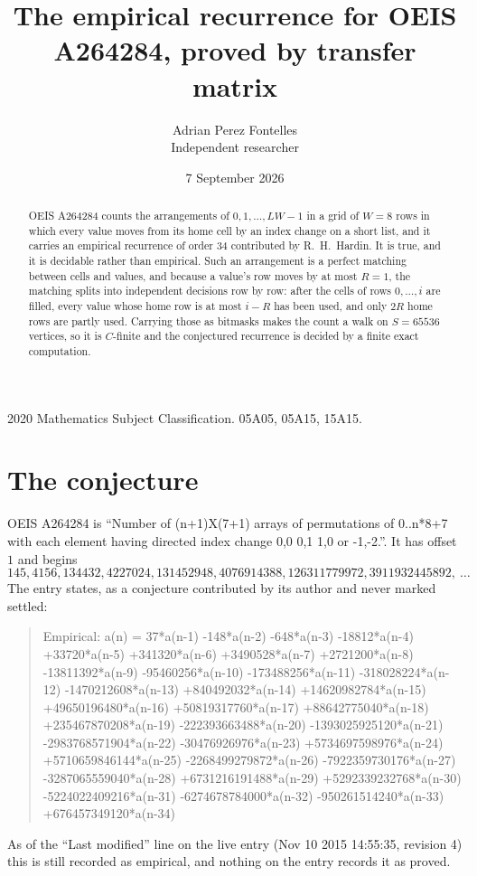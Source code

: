 \documentclass[11pt,a4paper]{article}
\title{The empirical recurrence for OEIS A264284, proved by transfer matrix}
\author{Adrian Perez Fontelles\\ \small Independent researcher}
\date{7 September 2026}
\theoremstyle{plain}
\theoremstyle{definition}
\begin{document}
\maketitle

\begin{abstract}
OEIS A264284 counts the arrangements of $0,1,\dots,LW-1$ in a grid of $W=8$ rows in which
every value moves from its home cell by an index change on a short list, and it carries an
empirical recurrence of order $34$ contributed by R.~H.~Hardin. It is true, and it is
decidable rather than empirical. Such an arrangement is a perfect matching between cells and
values, and because a value's row moves by at most $R=1$, the matching splits into
independent decisions row by row: after the cells of rows $0,\dots,i$ are filled,
every value whose home row is at most $i-R$ has been used, and only $2R$ home rows are
partly used. Carrying those as bitmasks makes the count a walk on $S=65536$ vertices, so it is
$C$-finite and the conjectured recurrence is decided by a finite exact computation.
\end{abstract}

\noindent\small 2020 Mathematics Subject Classification. 05A05, 05A15, 15A15.\normalsize

\section{The conjecture}

OEIS A264284 is ``Number of (n+1)X(7+1) arrays of permutations of 0..n*8+7 with each element having directed index change 0,0 0,1 1,0 or -1,-2.''. It has offset $1$ and begins
\[
145, 4156, 134432, 4227024, 131452948, 4076914388, 126311779972, 3911932445892,\ \dots
\]
The entry states, as a conjecture contributed by its author and never marked settled:
\begin{quote}
Empirical: a(n) = 37*a(n-1) -148*a(n-2) -648*a(n-3) -18812*a(n-4) +33720*a(n-5) +341320*a(n-6) +3490528*a(n-7) +2721200*a(n-8) -13811392*a(n-9) -95460256*a(n-10) -173488256*a(n-11) -318028224*a(n-12) -1470212608*a(n-13) +840492032*a(n-14) +14620982784*a(n-15) +49650196480*a(n-16) +50819317760*a(n-17) +88642775040*a(n-18) +235467870208*a(n-19) -222393663488*a(n-20) -1393025925120*a(n-21) -2983768571904*a(n-22) -30476926976*a(n-23) +5734697598976*a(n-24) +5710659846144*a(n-25) -2268499279872*a(n-26) -7922359730176*a(n-27) -3287065559040*a(n-28) +6731216191488*a(n-29) +5292339232768*a(n-30) -5224022409216*a(n-31) -6274678784000*a(n-32) -950261514240*a(n-33) +676457349120*a(n-34)
\end{quote}
As of the ``Last modified'' line on the live entry (Nov 10 2015 14:55:35, revision 4) this is still
recorded as empirical, and nothing on the entry records it as proved.
\end{document}
